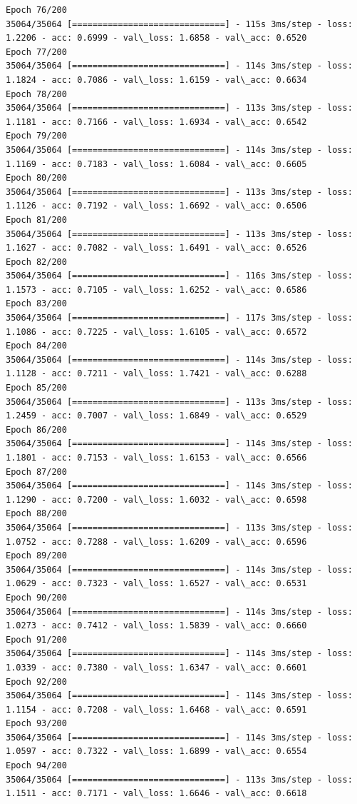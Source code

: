 \documentclass[11pt]{article}
\begin{document}
\begin{Verbatim}[commandchars=\\\{\}]
Epoch 76/200
35064/35064 [==============================] - 115s 3ms/step - loss: 1.2206 - acc: 0.6999 - val\_loss: 1.6858 - val\_acc: 0.6520
Epoch 77/200
35064/35064 [==============================] - 114s 3ms/step - loss: 1.1824 - acc: 0.7086 - val\_loss: 1.6159 - val\_acc: 0.6634
Epoch 78/200
35064/35064 [==============================] - 113s 3ms/step - loss: 1.1181 - acc: 0.7166 - val\_loss: 1.6934 - val\_acc: 0.6542
Epoch 79/200
35064/35064 [==============================] - 114s 3ms/step - loss: 1.1169 - acc: 0.7183 - val\_loss: 1.6084 - val\_acc: 0.6605
Epoch 80/200
35064/35064 [==============================] - 113s 3ms/step - loss: 1.1126 - acc: 0.7192 - val\_loss: 1.6692 - val\_acc: 0.6506
Epoch 81/200
35064/35064 [==============================] - 113s 3ms/step - loss: 1.1627 - acc: 0.7082 - val\_loss: 1.6491 - val\_acc: 0.6526
Epoch 82/200
35064/35064 [==============================] - 116s 3ms/step - loss: 1.1573 - acc: 0.7105 - val\_loss: 1.6252 - val\_acc: 0.6586
Epoch 83/200
35064/35064 [==============================] - 117s 3ms/step - loss: 1.1086 - acc: 0.7225 - val\_loss: 1.6105 - val\_acc: 0.6572
Epoch 84/200
35064/35064 [==============================] - 114s 3ms/step - loss: 1.1128 - acc: 0.7211 - val\_loss: 1.7421 - val\_acc: 0.6288
Epoch 85/200
35064/35064 [==============================] - 113s 3ms/step - loss: 1.2459 - acc: 0.7007 - val\_loss: 1.6849 - val\_acc: 0.6529
Epoch 86/200
35064/35064 [==============================] - 114s 3ms/step - loss: 1.1801 - acc: 0.7153 - val\_loss: 1.6153 - val\_acc: 0.6566
Epoch 87/200
35064/35064 [==============================] - 114s 3ms/step - loss: 1.1290 - acc: 0.7200 - val\_loss: 1.6032 - val\_acc: 0.6598
Epoch 88/200
35064/35064 [==============================] - 113s 3ms/step - loss: 1.0752 - acc: 0.7288 - val\_loss: 1.6209 - val\_acc: 0.6596
Epoch 89/200
35064/35064 [==============================] - 114s 3ms/step - loss: 1.0629 - acc: 0.7323 - val\_loss: 1.6527 - val\_acc: 0.6531
Epoch 90/200
35064/35064 [==============================] - 114s 3ms/step - loss: 1.0273 - acc: 0.7412 - val\_loss: 1.5839 - val\_acc: 0.6660
Epoch 91/200
35064/35064 [==============================] - 114s 3ms/step - loss: 1.0339 - acc: 0.7380 - val\_loss: 1.6347 - val\_acc: 0.6601
Epoch 92/200
35064/35064 [==============================] - 114s 3ms/step - loss: 1.1154 - acc: 0.7208 - val\_loss: 1.6468 - val\_acc: 0.6591
Epoch 93/200
35064/35064 [==============================] - 114s 3ms/step - loss: 1.0597 - acc: 0.7322 - val\_loss: 1.6899 - val\_acc: 0.6554
Epoch 94/200
35064/35064 [==============================] - 113s 3ms/step - loss: 1.1511 - acc: 0.7171 - val\_loss: 1.6646 - val\_acc: 0.6618

\end{Verbatim}
\end{document}
